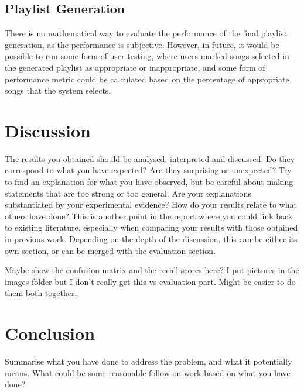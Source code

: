 \documentclass[11pt]{article}
\begin{document}
\subsection{Playlist Generation}

There is no mathematical way to evaluate the performance of the final playlist generation, as the performance is subjective. However, in future, it would be possible to run some form of user testing, where users marked songs selected in the generated playlist as appropriate or inappropriate, and some form of performance metric could be calculated based on the percentage of appropriate songs that the system selects.

\section{Discussion}
The results you obtained should be analysed, interpreted and discussed. Do they correspond to what you have expected? Are they surprising or unexpected? Try to find an explanation for what you have observed, but be careful about making statements that are too strong or too general. Are your explanations substantiated by your experimental evidence? How do your results relate to what others have done? This is another point in the report where you could link back to existing literature, especially when comparing your results with those obtained in previous work. Depending on the depth of the discussion, this can be either its own section, or can be merged with the evaluation section.


Maybe show the confusion matrix and the recall scores here? I put pictures in the images folder but I don't really get this vs evaluation part. Might be easier to do them both together.

\section{Conclusion}
Summarise what you have done to address the problem, and what it potentially means. What could be some reasonable follow-on work based on what you have done? 



\end{document}
